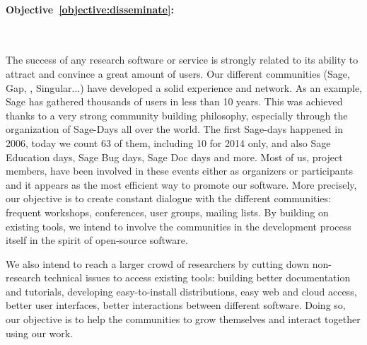 \documentclass[noworkareas,deliverables,keys]{euproposal}                  %
\begin{document}
\begin{proposal}
\paragraph{Objective~\ref{objective:disseminate}: }\ 

The success of any research software or service is strongly related to
its ability to attract and convince a great amount of users. Our
different communities (Sage, Gap, \PariGP, Singular...) have developed
a solid experience and network. As an example, Sage has gathered
thousands of users in less than 10 years. This was achieved thanks to
a very strong community building philosophy, especially through the
organization of Sage-Days all over the world. The first Sage-days
happened in 2006, today we count 63 of them, including 10 for 2014
only, and also Sage Education days, Sage Bug days, Sage Doc days and
more. Most of us, \TheProject{} project members, have been involved in
these events either as organizers or participants and it appears as
the most efficient way to promote our software. More precisely, our
objective is to create constant dialogue with the different
communities: frequent workshops, conferences, user groups, mailing
lists. By building on existing tools, we intend to involve the
communities in the development process itself in the spirit of
open-source software.

We also intend to reach a larger crowd of researchers by cutting down
non-research technical issues to access existing tools: building
better documentation and tutorials, developing easy-to-install
distributions, easy web and cloud access, better user interfaces,
better interactions between different software. Doing so, our
objective is to help the communities to grow themselves and interact
together using our work.


\clearpage

\draftpage


\draftpage


\draftpage



\end{proposal}
\end{document}
